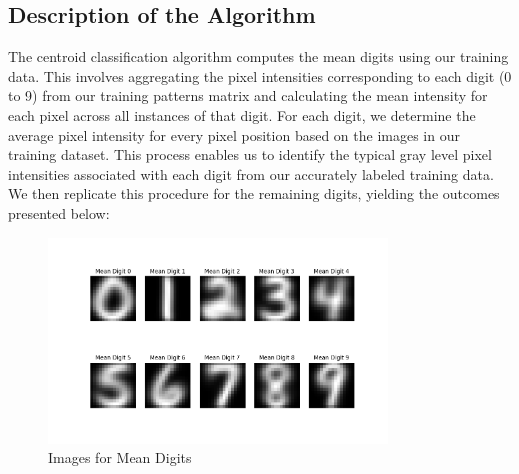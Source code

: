 \documentclass{article} %
\begin{document}
      \subsection{Description of the Algorithm}
        \label{SECT:SUBSECTION 3.1}
            The centroid classification algorithm computes the mean digits using our training data. This involves aggregating the pixel intensities corresponding to each digit (0 to 9) from our training patterns matrix and calculating the mean intensity for each pixel across all instances of that digit. For each digit, we determine the average pixel intensity for every pixel position based on the images in our training dataset. This process enables us to identify the typical gray level pixel intensities associated with each digit from our accurately labeled training data. We then replicate this procedure for the remaining digits, yielding the outcomes presented below:
            \begin{figure}[h]
                \centering
                \includegraphics[width=9cm]{Figure_2.png}
                \caption{Images for Mean Digits}
                \label{fig:fig2}
            \end{figure}

            \FloatBarrier
\end{document}
